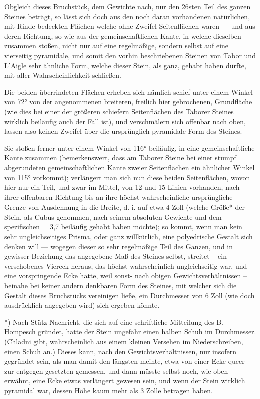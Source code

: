 \documentclass[a4paper, 11pt, oneside, german]{article}
\begin{document}
Obgleich dieses Bruchstück, dem Gewichte nach, nur den 26sten Teil des ganzen Steines beträgt, so lässt sich doch aus den noch daran vorhandenen natürlichen, mit Rinde bedeckten Flächen welche ohne Zweifel Seitenflächen waren --- und aus deren Richtung, so wie aus der gemeinschaftlichen Kante, in welche dieselben zusammen stoßen, nicht nur auf eine regelmäßige, sondern selbst auf eine vierseitig pyramidale, und somit den vorhin beschriebenen Steinen von Tabor und L'Aigle sehr ähnliche Form, welche dieser Stein, als ganz, gehabt haben dürfte, mit aller Wahrscheinlichkeit schließen.

Die beiden überrindeten Flächen erheben sich nämlich schief unter einem Winkel von 72° von der angenommenen breiteren, freilich hier gebrochenen, Grundfläche (wie dies bei einer der größeren schiefern Seitenflächen des Taborer Steines wirklich beiläufig auch der Fall ist), und verschmälern sich offenbar nach oben, lassen also keinen Zweifel über die ursprünglich pyramidale Form des Steines.

Sie stoßen ferner unter einem Winkel von 116° beiläufig, in eine gemeinschaftliche Kante zusammen (bemerkenswert, dass am Taborer Steine bei einer stumpf abgerundeten gemeinschaftlichen Kante zweier Seitenflächen ein ähnlicher Winkel von 115° vorkommt); verlängert man sich nun diese beiden Seitenflächen, wovon hier nur ein Teil, und zwar im Mittel, von 12 und 15 Linien vorhanden, nach ihrer offenbaren Richtung bis an ihre höchst wahrscheinliche ursprüngliche Grenze von Ausdehnung in die Breite, d. i. auf etwa 4 Zoll (welche Größe* der Stein, als Cubus genommen, nach seinem absoluten Gewichte und dem spezifischen = 3,7 beiläufig gehabt haben möchte); so kommt, wenn man kein sehr ungleichseitiges Prisma, oder ganz willkürlich, eine polyedrische Gestalt sich denken will --- wogegen dieser so sehr regelmäßige Teil des Ganzen, und in gewisser Beziehung das angegebene Maß des Steines selbst, streitet -- ein verschobenes Viereck heraus, das höchst wahrscheinlich ungleichseitig war, und eine vorspringende Ecke hatte, weil sonst- nach obigen Gewichtsverhältnissen -- beinahe bei keiner andern denkbaren Form des Steines, mit welcher sich die Gestalt dieses Bruchstücks vereinigen ließe, ein Durchmesser von 6 Zoll (wie doch ausdrücklich angegeben wird) sich ergeben könnte.

*) Nach Stütz Nachricht, die sich auf eine schriftliche Mitteilung des B. Hompesch gründet, hatte der Stein ungefähr einen halben Schuh im Durchmesser. (Chladni gibt, wahrscheinlich aus einem kleinen Versehen im Niederschreiben, einen Schuh an.) Dieses kann, nach den Gewichtsverhältnissen, nur insofern gegründet sein, als man damit den längsten meinte, etwa von einer Ecke queer zur entgegen gesetzten gemessen, und dann müsste selbst noch, wie oben erwähnt, eine Ecke etwas verlängert gewesen sein, und wenn der Stein wirklich pyramidal war, dessen Höhe kaum mehr als 3 Zolle betragen haben.
\end{document}

